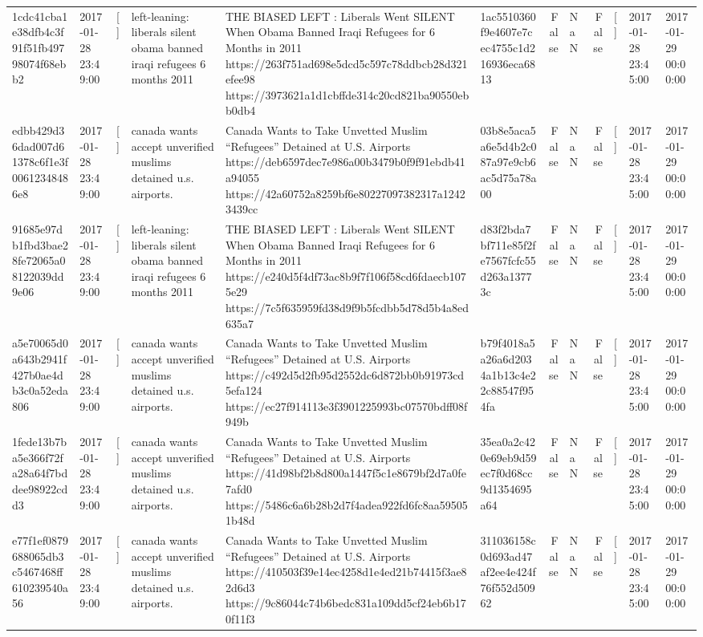 \begin{tabular}{llllllrlrlll}
1cdc41cba1e38dfb4c3f91f51fb49798074f68ebb2 & 2017-01-28 23:49:00 & [] & left-leaning: liberals silent obama banned iraqi refugees 6 months 2011 & THE BIASED LEFT : Liberals Went SILENT When Obama Banned Iraqi Refugees for 6 Months in 2011 https://263f751ad698e5dcd5c597c78ddbcb28d321efee98 https://3973621a1d1cbffde314c20cd821ba90550ebb0db4 & 1ac5510360f9e4607e7cec4755c1d216936eca6813 & False & NaN & False & [] & 2017-01-28 23:45:00 & 2017-01-29 00:00:00 \\
edbb429d36dad007d61378c6f1e3f00612348486e8 & 2017-01-28 23:49:00 & [] & canada wants accept unverified muslims detained u.s. airports. & Canada Wants to Take Unvetted Muslim “Refugees” Detained at U.S. Airports https://deb6597dec7e986a00b3479b0f9f91ebdb41a94055 https://42a60752a8259bf6e80227097382317a12423439cc & 03b8e5aca5a6e5d4b2c087a97e9cb6ac5d75a78a00 & False & NaN & False & [] & 2017-01-28 23:45:00 & 2017-01-29 00:00:00 \\
91685e97db1fbd3bae28fe72065a08122039dd9e06 & 2017-01-28 23:49:00 & [] & left-leaning: liberals silent obama banned iraqi refugees 6 months 2011 & THE BIASED LEFT : Liberals Went SILENT When Obama Banned Iraqi Refugees for 6 Months in 2011 https://e240d5f4df73ac8b9f7f106f58cd6fdaecb1075e29 https://7c5f635959fd38d9f9b5fcdbb5d78d5b4a8ed635a7 & d83f2bda7bf711e85f2fe7567fcfc55d263a13773c & False & NaN & False & [] & 2017-01-28 23:45:00 & 2017-01-29 00:00:00 \\
a5e70065d0a643b2941f427b0ae4db3c0a52eda806 & 2017-01-28 23:49:00 & [] & canada wants accept unverified muslims detained u.s. airports. & Canada Wants to Take Unvetted Muslim “Refugees” Detained at U.S. Airports https://c492d5d2fb95d2552dc6d872bb0b91973cd5efa124 https://ec27f914113e3f3901225993bc07570bdff08f949b & b79f4018a5a26a6d2034a1b13c4e22c88547f954fa & False & NaN & False & [] & 2017-01-28 23:45:00 & 2017-01-29 00:00:00 \\
1fede13b7ba5e366f72fa28a64f7bddee98922cdd3 & 2017-01-28 23:49:00 & [] & canada wants accept unverified muslims detained u.s. airports. & Canada Wants to Take Unvetted Muslim “Refugees” Detained at U.S. Airports https://41d98bf2b8d800a1447f5c1e8679bf2d7a0fe7afd0 https://5486c6a6b28b2d7f4adea922fd6fc8aa595051b48d & 35ea0a2c420e69eb9d59ec7f0d68cc9d1354695a64 & False & NaN & False & [] & 2017-01-28 23:45:00 & 2017-01-29 00:00:00 \\
e77f1ef0879688065db3c5467468ff610239540a56 & 2017-01-28 23:49:00 & [] & canada wants accept unverified muslims detained u.s. airports. & Canada Wants to Take Unvetted Muslim “Refugees” Detained at U.S. Airports https://410503f39e14ec4258d1e4ed21b74415f3ae82d6d3 https://9c86044c74b6bedc831a109dd5cf24eb6b170f11f3 & 311036158c0d693ad47af2ee4e424f76f552d50962 & False & NaN & False & [] & 2017-01-28 23:45:00 & 2017-01-29 00:00:00 \\

\end{tabular}
